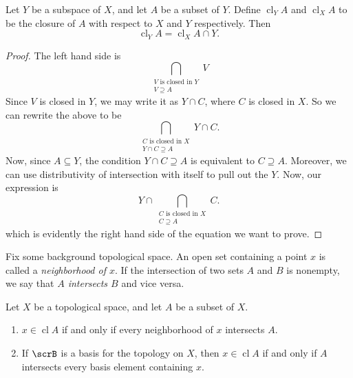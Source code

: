 \documentclass{article}
\DeclareMathOperator{\closure}{cl}
\begin{document}
\begin{theorem}
    Let $Y$ be a subspace of $X$, and let $A$ be a subset of $Y$.
    Define $\closure_Y A$ and $\closure_X A$ to be the closure of $A$ with respect to $X$ and $Y$ respectively.
    Then
    \[
    \closure_Y A = \closure_X A \cap Y.
    \]
\end{theorem}

\begin{proof}
    The left hand side is
    \[
        \bigcap_{\substack{V \text{ is closed in } Y \\ V \supseteq A}} V 
    \]
    Since $V$ is closed in $Y$, we may write it as $Y \cap C$, where $C$ is closed in $X$.
    So we can rewrite the above to be
    \[
        \bigcap_{\substack{C \text{ is closed in } X \\ Y \cap C \supseteq A}} Y \cap C.
    \]
    Now, since $A \subseteq Y$, the condition $Y \cap C \supseteq A$ is equivalent to $C \supseteq A$.
    Moreover, we can use distributivity of intersection with itself to pull out the $Y$.
    Now, our expression is
    \[
        Y \cap \bigcap_{\substack{C \text{ is closed in } X \\ C \supseteq A}} C.
    \]
    which is evidently the right hand side of the equation we want to prove.
\end{proof}

\begin{definition}
    Fix some background topological space.
    An open set containing a point $x$ is called a \textit{neighborhood of $x$}.
    If the intersection of two sets $A$ and $B$ is nonempty, we say that \textit{$A$ intersects $B$} and vice versa.
\end{definition}

\begin{theorem}
    Let $X$ be a topological space, and let $A$ be a subset of $X$.
    \begin{enumerate}[label=(\alph*)]
        \item $x \in \closure A$ if and only if every neighborhood of $x$ intersects $A$.
        \item If $\scrB$ is a basis for the topology on $X$, then $x \in \closure A$ if and only if $A$ intersects every basis element containing $x$.
    \end{enumerate}
\end{theorem}
\end{document}
